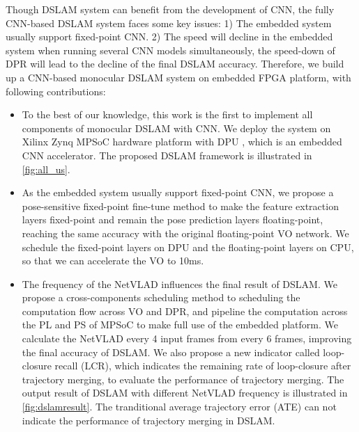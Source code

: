 Though DSLAM system can benefit from the development of CNN, the fully CNN-based DSLAM system faces some key issues: 1) The embedded system usually support fixed-point CNN. 2) The speed will decline in the embedded system when running several CNN models simultaneously, the speed-down of DPR will lead to the decline of the final DSLAM accuracy. Therefore, we build up a CNN-based monocular DSLAM system on embedded FPGA platform, with following contributions:

\begin{itemize}
\item To the best of our knowledge, this work is the first to implement all components of monocular DSLAM with CNN.
We deploy the system on Xilinx Zynq MPSoC hardware platform with DPU \cite{Tech:2019360}, which is an embedded CNN accelerator. The proposed DSLAM framework is illustrated in \cref{fig:all_us}.
\item As the embedded system usually support fixed-point CNN, we propose a pose-sensitive fixed-point fine-tune method to make the feature extraction layers fixed-point and remain the pose prediction layers floating-point, reaching the same accuracy with the original floating-point VO network. We schedule the fixed-point layers on DPU and the floating-point layers on CPU, so that we can accelerate the VO to 10ms.
\item The frequency of the NetVLAD influences the final result of DSLAM. We propose a cross-components scheduling method to scheduling the computation flow across VO and DPR, and pipeline the computation across the PL and PS of MPSoC to make full use of the embedded platform. We calculate the NetVLAD every 4 input frames from every 6 frames, improving the final accuracy of DSLAM. 
We also propose a new indicator called loop-closure recall (LCR), which indicates the remaining rate of loop-closure after trajectory merging, to evaluate the performance of trajectory merging. The output result of DSLAM with different NetVLAD frequency is illustrated in \cref{fig:dslamresult}. The tranditional average trajectory error (ATE) can not indicate the performance of trajectory merging in DSLAM.
\end{itemize}



